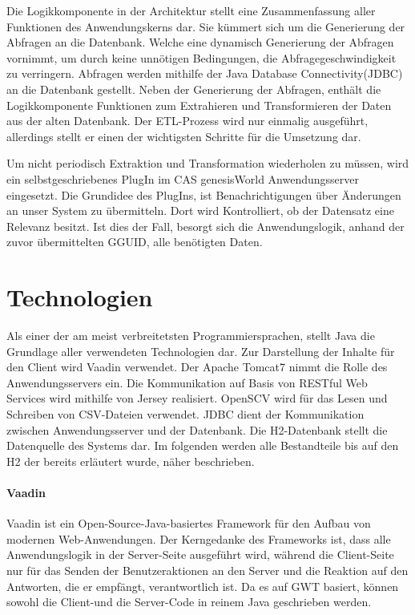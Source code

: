 Die Logikkomponente in der Architektur stellt eine Zusammenfassung aller Funktionen des Anwendungskerns dar. Sie kümmert sich um die Generierung der Abfragen an die Datenbank. Welche eine dynamisch Generierung der Abfragen vornimmt, um durch keine unnötigen Bedingungen, die Abfragegeschwindigkeit zu verringern. Abfragen werden mithilfe der Java Database Connectivity(JDBC) an die Datenbank gestellt. Neben der Generierung der Abfragen, enthält die Logikkomponente Funktionen zum Extrahieren und Transformieren der Daten aus der alten Datenbank. Der ETL-Prozess wird nur einmalig ausgeführt, allerdings stellt er einen der wichtigsten Schritte für die Umsetzung dar. 

Um nicht periodisch Extraktion und Transformation wiederholen zu müssen, wird ein selbstgeschriebenes PlugIn im CAS genesisWorld Anwendungsserver eingesetzt. Die Grundidee des PlugIns, ist Benachrichtigungen über Änderungen an unser System zu übermitteln. Dort wird Kontrolliert, ob der Datensatz eine Relevanz besitzt. Ist dies der Fall, besorgt sich die Anwendungslogik, anhand der zuvor übermittelten GGUID, alle benötigten Daten.

\section{Technologien}

Als einer der am meist verbreitetsten Programmiersprachen, stellt Java die Grundlage aller verwendeten Technologien dar. Zur Darstellung der Inhalte für den Client wird Vaadin verwendet. Der Apache Tomcat7 nimmt die Rolle des Anwendungsservers ein. Die Kommunikation auf Basis von RESTful Web Services wird mithilfe von Jersey realisiert. OpenSCV wird für das Lesen und Schreiben von CSV-Dateien verwendet. JDBC dient der Kommunikation zwischen Anwendungsserver und der Datenbank. Die H2-Datenbank stellt die Datenquelle des Systems dar. Im folgenden werden alle Bestandteile bis auf den H2 der bereits erläutert wurde, näher beschrieben. 

\paragraph{Vaadin}

Vaadin ist ein Open-Source-Java-basiertes Framework für den Aufbau von modernen Web-Anwendungen. Der Kerngedanke des Frameworks ist, dass alle Anwendungslogik in der Server-Seite ausgeführt wird, während die Client-Seite nur für das Senden der Benutzeraktionen an den Server und die Reaktion auf den Antworten, die er empfängt, verantwortlich ist. Da es auf GWT basiert, können sowohl die Client-und die Server-Code in reinem Java geschrieben werden.

